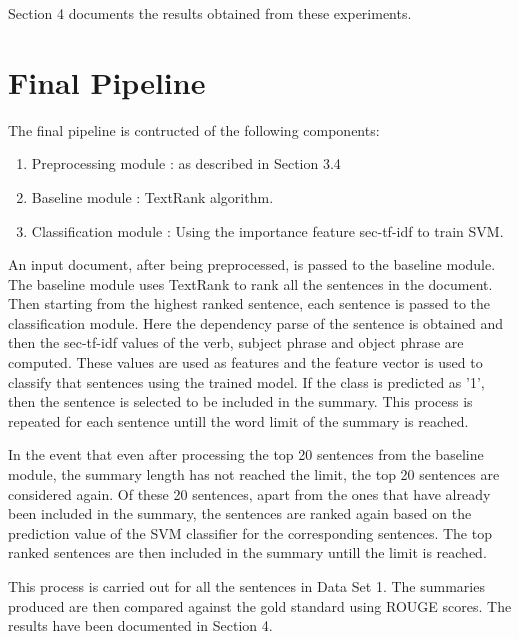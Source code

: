 Section 4 documents the results obtained from these experiments.

\section{Final Pipeline}
The final pipeline is contructed of the following components:
\begin{enumerate}
\item Preprocessing module : as described in Section 3.4
\item Baseline module : TextRank algorithm.
\item Classification module : Using the importance feature sec-tf-idf to train SVM.
\end{enumerate}

An input document, after being preprocessed, is passed to the baseline module.
The baseline module uses TextRank to rank all the sentences in the document.
Then starting from the highest ranked sentence, each sentence is passed to the classification module. Here the dependency parse of the sentence is obtained and then the sec-tf-idf values of the verb, subject phrase and object phrase are computed.
These values are used as features and the feature vector is used to classify that sentences using the trained model.
If the class is predicted as '1', then the sentence is selected to be included in the summary.
This process is repeated for each sentence untill the word limit of the summary is reached.

In the event that even after processing the top 20 sentences from the baseline module, the summary length has not reached the limit, the top 20 sentences are considered again.
Of these 20 sentences, apart from the ones that have already been included in the summary, the sentences are ranked again based on the prediction value of the SVM classifier for the corresponding sentences.
The top ranked sentences are then included in the summary untill the limit is reached.

This process is carried out for all the sentences in Data Set 1.
The summaries produced are then compared against the gold standard using ROUGE scores.
The results have been documented in Section 4.